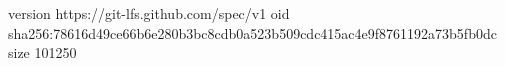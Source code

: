 version https://git-lfs.github.com/spec/v1
oid sha256:78616d49ce66b6e280b3bc8cdb0a523b509cdc415ac4e9f8761192a73b5fb0dc
size 101250
